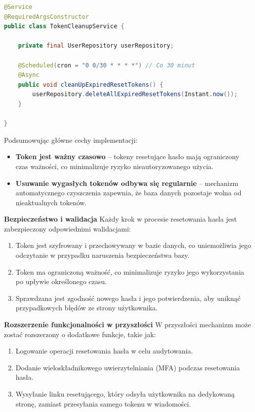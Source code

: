 \begin{lstlisting}[language=Java, style=JavaStyle, caption=Usługa czyszczenia wygasłych tokenów \texttt{TokenCleanupService}]
@Service
@RequiredArgsConstructor
public class TokenCleanupService {

    private final UserRepository userRepository;

    @Scheduled(cron = "0 0/30 * * * *") // Co 30 minut
    @Async
    public void cleanUpExpiredResetTokens() {
        userRepository.deleteAllExpiredResetTokens(Instant.now());
    }

}
\end{lstlisting}
Podsumowując główne cechy implementacji:
\begin{itemize}
    \item \textbf{Token jest ważny czasowo} -- tokeny resetujące hasło mają ograniczony czas ważności, co minimalizuje ryzyko nieautoryzowanego użycia.
    \item \textbf{Usuwanie wygasłych tokenów odbywa się regularnie} -- mechanizm automatycznego czyszczenia zapewnia, że baza danych pozostaje wolna od nieaktualnych tokenów.
\end{itemize}

\noindent \textbf{Bezpieczeństwo i walidacja}\newline
Każdy krok w procesie resetowania hasła jest zabezpieczony odpowiednimi walidacjami:
\begin{enumerate}
    \item Token jest szyfrowany i przechowywany w bazie danych, co uniemożliwia jego odczytanie w przypadku naruszenia bezpieczeństwa bazy.
    \item Token ma ograniczoną ważność, co minimalizuje ryzyko jego wykorzystania po upływie określonego czasu.
    \item Sprawdzana jest zgodność nowego hasła i jego potwierdzenia, aby uniknąć przypadkowych błędów ze strony użytkownika.
\end{enumerate}

\noindent \textbf{Rozszerzenie funkcjonalności w przyszłości}\newline
W przyszłości mechanizm może zostać rozszerzony o dodatkowe funkcje, takie jak:
\begin{enumerate}
    \item Logowanie operacji resetowania hasła w celu audytowania.
    \item Dodanie wieloskładnikowego uwierzytelniania (MFA) podczas resetowania hasła.
    \item Wysyłanie linku resetującego, który odsyła użytkownika na dedykowaną stronę, zamiast przesyłania samego tokenu w wiadomości.
\end{enumerate}

